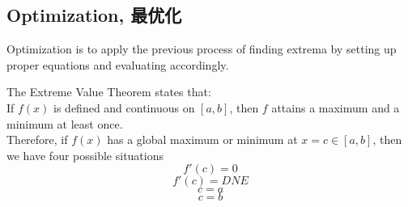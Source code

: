 \subsection{Optimization, 最优化}
Optimization is to apply the previous process of finding extrema by setting up proper equations and evaluating accordingly.
\begin{theorem}
    The Extreme Value Theorem states that: \\
    If $f(x)$ is defined and continuous on $[a, b]$, then $f$ attains a maximum and a minimum at least once. \\
    Therefore, if $f(x)$ has a global maximum or minimum at $x = c \in [a, b]$, then we have four possible situations
    $$f'(c) = 0$$
    $$f'(c) = DNE$$
    $$c = a$$
    $$c = b$$
\end{theorem}


\newpage